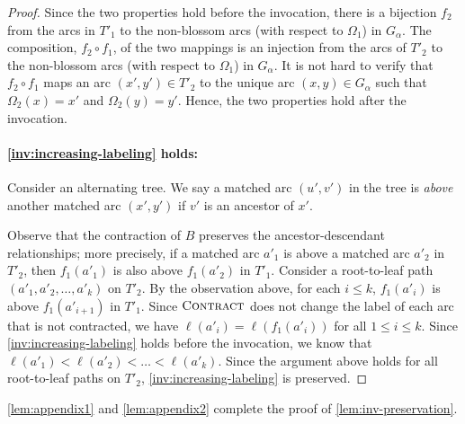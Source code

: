 \documentclass{article}
\newcommand{\alp}{\alpha}
\newcommand{\Omg}{\Omega}
\newcommand{\algContract}{\textsc{Contract}\xspace}
\begin{document}
\begin{proof}
Since the two properties hold before the invocation, there is a bijection $f_2$ from the arcs in $T'_1$ to the non-blossom arcs (with respect to $\Omg_1$) in $G_\alp$.
The composition, $f_2 \circ f_1$, of the two mappings is an injection from the arcs of $T'_2$ to the non-blossom arcs (with respect to $\Omg_1$) in $G_\alp$.
It is not hard to verify that $f_2 \circ f_1$ maps an arc $(x', y') \in T'_2$ to the unique arc $(x, y) \in G_\alp$ such that $\Omg_2(x) = x'$ and $\Omg_2(y) = y'$.
Hence, the two properties hold after the invocation.









\paragraph{\cref{inv:increasing-labeling} holds:}
Consider an alternating tree.
We say a matched arc $(u', v')$ in the tree is \emph{above} another matched arc $(x', y')$ if $v'$ is an ancestor of $x'$.

Observe that the contraction of $B$ preserves the ancestor-descendant relationships;
more precisely, if a matched arc $a'_1$ is above a matched arc $a'_2$ in $T'_2$, then $f_1(a'_1)$ is also above $f_1(a'_2)$ in $T'_1$.
Consider a root-to-leaf path $(a'_1, a'_2, \dots, a'_k)$ on $T'_2$.
By the observation above, for each $i \leq k$, $f_1(a'_i)$ is above $f_1(a'_{i+1})$ in $T'_1$.
Since $\algContract$ does not change the label of each arc that is not contracted, we have $\ell(a'_i) = \ell(f_1(a'_i))$ for all $1 \leq i \leq k$.
Since \cref{inv:increasing-labeling} holds before the invocation, we know that $\ell(a'_1) < \ell(a'_2) < \dots < \ell(a'_k)$.
Since the argument above holds for all root-to-leaf paths on $T'_2$, \cref{inv:increasing-labeling} is preserved.
\end{proof}

\noindent \cref{lem:appendix1} and \cref{lem:appendix2} complete the proof of \cref{lem:inv-preservation}.
\end{document}
